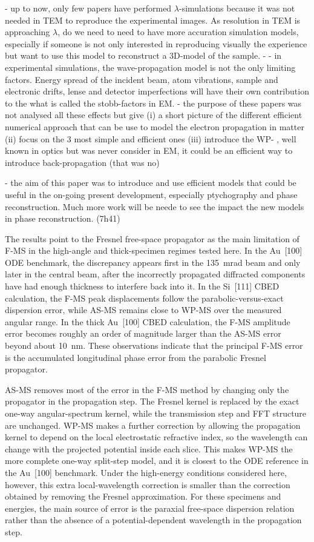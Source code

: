 \documentclass[preprint,12pt,number]{elsarticle}
\begin{document}
- up to now, only few papers have performed $\lambda$-simulations because it was not needed in TEM to reproduce the experimental images. As resolution in TEM is approaching $\lambda$, do we need to need to have more accuration simulation models, especially if someone is not only interested in reproducing visually the experience but want to use this model to reconstruct a 3D-model of the sample. 
- 
- in experimental simulations, the wave-propagation model is not the only limiting factors. Energy spread of the incident beam, atom vibrations, sample and electronic drifts, lense and detector imperfections will have their own contribution to the what is called the stobb-factors in EM. 
- the purpose of these papers was not analysed all these effects but give (i) a short picture of the different efficient numerical approach that can be use to model the electron propagation in matter (ii) focus on the 3 most simple and efficient ones (iii) introduce the WP- , well known in optics but was never consider in EM, it  could be an efficient way to introduce back-propagation (that was no)

- the aim of this paper was to introduce and use efficient models that could be useful in the on-going present development, especially ptychography and phase reconstruction. Much more work will be neede to see the impact the new models in phase reconstruction.  (7h41)


The results point to the Fresnel free-space propagator as the main limitation
of F-MS in the high-angle and thick-specimen regimes tested here. In the
Au~[100] ODE benchmark, the discrepancy appears first in the 135~mrad beam and
only later in the central beam, after the incorrectly propagated diffracted
components have had enough thickness to interfere back into it. In the
Si~[111] CBED calculation, the F-MS peak displacements follow the
parabolic-versus-exact dispersion error, while AS-MS remains close to WP-MS
over the measured angular range. In the thick Au~[100] CBED calculation, the
F-MS amplitude error becomes roughly an order of magnitude larger than the
AS-MS error beyond about 10~nm. These observations indicate that the principal
F-MS error is the accumulated longitudinal phase error from the parabolic
Fresnel propagator. 

AS-MS removes most of the error in the F-MS method by changing only the propagator in the propagation step. The
Fresnel kernel is replaced by the exact one-way angular-spectrum kernel, while
the transmission step and FFT structure are unchanged. WP-MS makes a further
correction by allowing the propagation kernel to depend on the local
electrostatic refractive index, so the wavelength can change with the projected
potential inside each slice. This makes WP-MS the more complete one-way
split-step model, and it is closest to the ODE reference in the Au~[100]
benchmark. Under the high-energy conditions considered here, however, this
extra local-wavelength correction is smaller than the correction obtained by
removing the Fresnel approximation. For these specimens and energies, the main
source of error is the paraxial free-space dispersion relation rather than the
absence of a potential-dependent wavelength in the propagation step.
\end{document}
